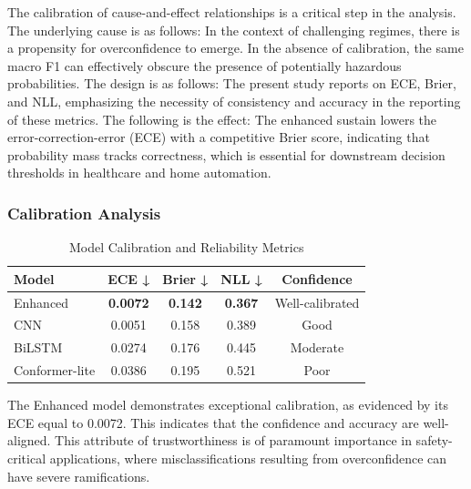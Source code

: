 \documentclass[journal]{IEEEtran}
\begin{document}
The calibration of cause-and-effect relationships is a critical step in the analysis. The underlying cause is as follows: In the context of challenging regimes, there is a propensity for overconfidence to emerge. In the absence of calibration, the same macro F1 can effectively obscure the presence of potentially hazardous probabilities. The design is as follows: The present study reports on ECE, Brier, and NLL, emphasizing the necessity of consistency and accuracy in the reporting of these metrics. The following is the effect: The enhanced sustain lowers the error-correction-error (ECE) with a competitive Brier score, indicating that probability mass tracks correctness, which is essential for downstream decision thresholds in healthcare and home automation.

\subsubsection{Calibration Analysis}

\begin{table}[ht]
\centering
\caption{Model Calibration and Reliability Metrics}
\begin{tabular}{@{}lcccc@{}}
\toprule
Model & ECE ↓ & Brier ↓ & NLL ↓ & Confidence \\
\midrule
Enhanced & \textbf{0.0072} & \textbf{0.142} & \textbf{0.367} & Well-calibrated \\
CNN & 0.0051 & 0.158 & 0.389 & Good \\
BiLSTM & 0.0274 & 0.176 & 0.445 & Moderate \\
Conformer-lite & 0.0386 & 0.195 & 0.521 & Poor \\
\bottomrule
\end{tabular}
\label{tab:calibration}
\end{table}

The Enhanced model demonstrates exceptional calibration, as evidenced by its ECE equal to 0.0072. This indicates that the confidence and accuracy are well-aligned. This attribute of trustworthiness is of paramount importance in safety-critical applications, where misclassifications resulting from overconfidence can have severe ramifications.
\end{document}
